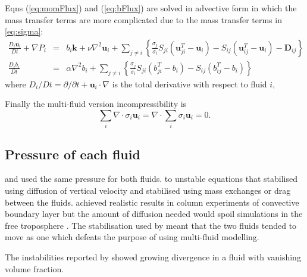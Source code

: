 \documentclass[draft]{agujournal2019}
\begin{document}
Eqns (\ref{eq:momFlux}) and (\ref{eq:bFlux}) are solved in advective form in which the mass transfer terms are more complicated due to the mass transfer terms in \ref{eq:sigma}:
\begin{eqnarray}
\frac{D_{i}\mathbf{u}_{i}}{Dt}+\nabla P_{i}
& = &
b_{i}\mathbf{k}+\nu\nabla^{2}\mathbf{u}_{i}+\sum_{j\ne i}\left\{ \frac{\sigma_{j}}{\sigma_{i}}S_{ji}\left(\mathbf{u}_{ji}^{T}-\mathbf{u}_{i}\right)-S_{ij}(\mathbf{u}_{ij}^{T}-\mathbf{u}_{i})-\mathbf{D}_{ij}\right\}
\label{eq:mom}\\
\frac{D_{i}b_{i}}{Dt}
& = &
\alpha\nabla^{2}b_{i}+\sum_{j\ne i}\left\{ \frac{\sigma_{j}}{\sigma_{i}}S_{ji}\left(b_{ji}^{T}-b_{i}\right)-S_{ij}\left(b_{ij}^{T}-b_{i}\right)\right\} \label{eq:b}
\end{eqnarray}
where $D_{i}\big/Dt=\partial/\partial t+\mathbf{u}_{i}\cdot\nabla$ is the total derivative with respect to fluid $i$, 

Finally the multi-fluid version incompressibility is
\begin{equation}
\sum_{i}\nabla\cdot\sigma_{i}\mathbf{u}_{i}  = \nabla\cdot\sum_{i}\sigma_{i}\mathbf{u}_{i}=0.
\label{eq:divFree}
\end{equation}

\subsection{Pressure of each fluid \label{subsec:fluidPressure}}

 and 
{used the same pressure for both fluids.}
 to unstable equations that 
stabilised using diffusion of vertical velocity and 
stabilised using mass exchanges or drag between the fluids. 
achieved realistic results in  column experiments of  convective
boundary layer but the amount of diffusion needed would spoil simulations
in the free troposphere . The stabilisation used by  meant
that the two fluids tended to move as one which defeats the purpose
of using multi-fluid modelling. 

The instabilities reported by  showed growing divergence
in a fluid with vanishing volume fraction. 
\end{document}
